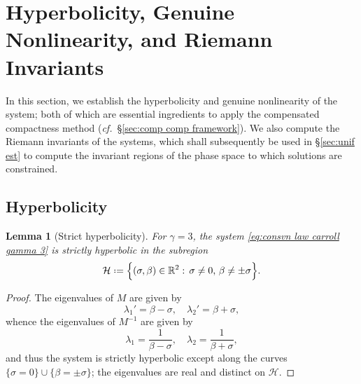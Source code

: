\documentclass[11pt,a4paper,reqno]{amsart}
\numberwithin{equation}{section}
\newtheorem{lemma}{Lemma}[section]
\theoremstyle{definition}
\theoremstyle{remark}
\newcommand*{\defeq}{\mathrel{\vcenter{\baselineskip0.5ex \lineskiplimit0pt
                     \hbox{\scriptsize.}\hbox{\scriptsize.}}}%
                     =}
\begin{document}
{\section{Hyperbolicity, Genuine Nonlinearity, and Riemann Invariants}\label{sec:hyperbolicity}




In this section, we establish the hyperbolicity and genuine nonlinearity of the system; both of which are essential ingredients to apply the compensated compactness method (\textit{cf.}~\S \ref{sec:comp comp framework}). We also compute the Riemann invariants of the systems, which shall subsequently be used in \S \ref{sec:unif est} to compute the invariant regions of the phase space to which solutions are constrained. 

\subsection{Hyperbolicity} 

\begin{lemma}[Strict hyperbolicity]\label{lem:strictly hyp}
  For $\gamma=3$, the system \eqref{eq:consvn law carroll gamma 3} is strictly hyperbolic in the subregion 
    \begin{equation*}
        \mathcal{H} \defeq \Big\{ (\sigma,\beta) \in \mathbb{R}^2 : \, \sigma \neq 0, \, \beta \neq \pm \sigma  \Big\}. 
    \end{equation*}
\end{lemma}

\begin{proof}
The eigenvalues of $M$ are given by 
\begin{equation*}
    \lambda_1' = \beta - \sigma, \quad \lambda_2' = \beta + \sigma, 
\end{equation*}
whence the eigenvalues of $M^{-1}$ are given by 
\begin{equation*}
    \lambda_1 = \frac{1}{\beta - \sigma}, \quad \lambda_2 = \frac{1}{\beta + \sigma}, 
\end{equation*}
and thus the system is strictly hyperbolic except along the curves $\{\sigma = 0\}\cup \{\beta = \pm \sigma\}$; the eigenvalues are real and distinct on $\mathcal{H}$.
\end{proof}

}
\end{document}

